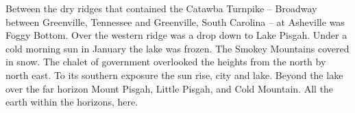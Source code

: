

Between the dry ridges that contained the Catawba Turnpike -- Broadway
between Greenville, Tennessee and Greenville, South Carolina -- at
Asheville was Foggy Bottom.  Over the western ridge was a drop down to
Lake Pisgah.  Under a cold morning sun in January the lake was frozen.
The Smokey Mountains covered in snow.  The chalet of government
overlooked the heights from the north by north east.  To its southern
exposure the sun rise, city and lake.  Beyond the lake over the far
horizon Mount Pisgah, Little Pisgah, and Cold Mountain.  All the earth
within the horizons, here.

\bye
